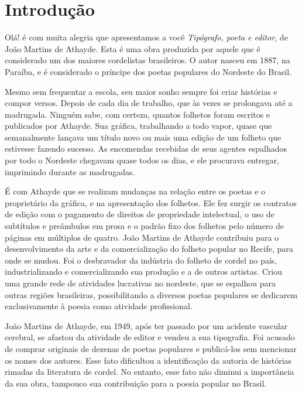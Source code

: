 \documentclass[12pt]{extarticle}
\begin{document}
\tableofcontents

\section{Introdução}

Olá! é com muita alegria que apresentamos a você \emph{Tipógrafo, poeta e editor}, de João Martins de Athayde.
Esta é uma obra produzida por aquele que é considerado um dos maiores cordelistas brasileiros. O autor nasceu em 1887, na Paraíba, e é considerado o príncipe dos poetas populares do Nordeste do Brasil. 

Mesmo sem frequentar a escola, seu maior sonho sempre foi criar histórias e compor versos. Depois de cada dia de trabalho, que às vezes se prolongava até a madrugada. Ninguém sabe, com certeza, quantos folhetos foram escritos e publicados por Athayde. Sua gráfica, trabalhando a todo vapor, quase que semanalmente lançava um título novo ou mais uma edição de um folheto que estivesse fazendo sucesso. As encomendas recebidas de seus agentes espalhados por todo o Nordeste chegavam quase todos os dias, e ele procurava entregar, imprimindo durante as madrugadas. 

É com Athayde que se realizam mudanças na relação entre os poetas e o proprietário da gráfica, e na apresentação dos folhetos. Ele fez surgir os contratos de edição com o pagamento de direitos de propriedade intelectual, o uso de subtítulos e preâmbulos em prosa e o padrão fixo dos folhetos pelo número de páginas em múltiplos de quatro. João Martins de Athayde contribuiu para o desenvolvimento da arte e da comercialização do folheto popular no Recife, para onde se mudou. Foi o desbravador da indústria do folheto de cordel no país, industrializando e comercializando sua produção e a de outros artistas. Criou uma grande rede de atividades lucrativas no nordeste, que se espalhou para outras regiões brasileiras, possibilitando a diversos poetas populares se dedicarem exclusivamente à poesia como atividade profissional. 

João Martins de Athayde, em 1949, após ter passado por um acidente vascular cerebral, se afastou da atividade de editor e vendeu a sua tipografia. Foi acusado de comprar originais de dezenas de poetas populares e publicá-los sem mencionar os nomes dos autores. Esse fato dificultou a identificação da autoria de histórias rimadas da literatura de cordel. No entanto, esse fato não diminui a importância da sua obra, tampouco sua contribuição para a poesia popular no Brasil.
\end{document}
